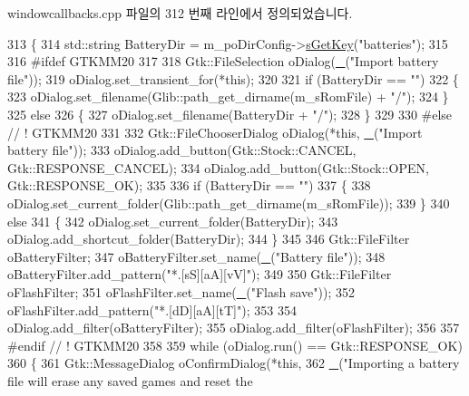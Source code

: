 windowcallbacks.\+cpp 파일의 312 번째 라인에서 정의되었습니다.


\begin{DoxyCode}
313 \{
314   std::string BatteryDir = m\_poDirConfig->\mbox{\hyperlink{class_v_b_a_1_1_config_1_1_section_a7ac9dfabf38bc1db83a6017e130f04ac}{sGetKey}}(\textcolor{stringliteral}{"batteries"});
315 
316 \textcolor{preprocessor}{#ifdef GTKMM20}
317 
318   Gtk::FileSelection oDialog(\mbox{\hyperlink{getopt_8c_a86a239addea586602343007a370bf8ad}{\_}}(\textcolor{stringliteral}{"Import battery file"}));
319   oDialog.set\_transient\_for(*\textcolor{keyword}{this});
320 
321   \textcolor{keywordflow}{if} (BatteryDir == \textcolor{stringliteral}{""})
322   \{
323     oDialog.set\_filename(Glib::path\_get\_dirname(m\_sRomFile) + \textcolor{stringliteral}{"/"});
324   \}
325   \textcolor{keywordflow}{else}
326   \{
327     oDialog.set\_filename(BatteryDir + \textcolor{stringliteral}{"/"});
328   \}
329 
330 \textcolor{preprocessor}{#else // ! GTKMM20}
331 
332   Gtk::FileChooserDialog oDialog(*\textcolor{keyword}{this}, \mbox{\hyperlink{getopt_8c_a86a239addea586602343007a370bf8ad}{\_}}(\textcolor{stringliteral}{"Import battery file"}));
333   oDialog.add\_button(Gtk::Stock::CANCEL, Gtk::RESPONSE\_CANCEL);
334   oDialog.add\_button(Gtk::Stock::OPEN,   Gtk::RESPONSE\_OK);
335 
336   \textcolor{keywordflow}{if} (BatteryDir == \textcolor{stringliteral}{""})
337   \{
338     oDialog.set\_current\_folder(Glib::path\_get\_dirname(m\_sRomFile));
339   \}
340   \textcolor{keywordflow}{else}
341   \{
342     oDialog.set\_current\_folder(BatteryDir);
343     oDialog.add\_shortcut\_folder(BatteryDir);
344   \}
345 
346   Gtk::FileFilter oBatteryFilter;
347   oBatteryFilter.set\_name(\mbox{\hyperlink{getopt_8c_a86a239addea586602343007a370bf8ad}{\_}}(\textcolor{stringliteral}{"Battery file"}));
348   oBatteryFilter.add\_pattern(\textcolor{stringliteral}{"*.[sS][aA][vV]"});
349 
350   Gtk::FileFilter oFlashFilter;
351   oFlashFilter.set\_name(\mbox{\hyperlink{getopt_8c_a86a239addea586602343007a370bf8ad}{\_}}(\textcolor{stringliteral}{"Flash save"}));
352   oFlashFilter.add\_pattern(\textcolor{stringliteral}{"*.[dD][aA][tT]"});
353 
354   oDialog.add\_filter(oBatteryFilter);
355   oDialog.add\_filter(oFlashFilter);
356 
357 \textcolor{preprocessor}{#endif // ! GTKMM20}
358 
359   \textcolor{keywordflow}{while} (oDialog.run() == Gtk::RESPONSE\_OK)
360   \{
361     Gtk::MessageDialog oConfirmDialog(*\textcolor{keyword}{this},
362                                       \mbox{\hyperlink{getopt_8c_a86a239addea586602343007a370bf8ad}{\_}}(\textcolor{stringliteral}{"Importing a battery file will erase any saved games and reset the
}
\end{DoxyCode}
